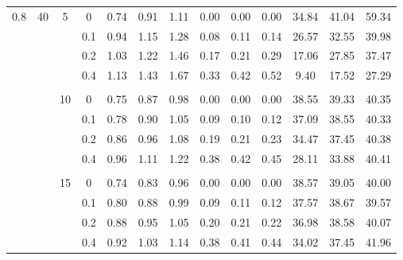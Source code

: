 \documentclass[]{article}
\begin{document}
\begin{table}[h!]
\begin{tabular}{cccc|ccc@{\hskip 0.3in}ccc@{\hskip 0.3in}ccc}
0.8        & 40    & 5            & 0      & 0.74    & 0.91  & 1.11  & 0.00   & 0.00  & 0.00  & 34.84 & 41.04 & 59.34 \\
           &       &              & 0.1    & 0.94    & 1.15  & 1.28  & 0.08   & 0.11  & 0.14  & 26.57 & 32.55 & 39.98 \\
           &       &              & 0.2    & 1.03    & 1.22  & 1.46  & 0.17   & 0.21  & 0.29  & 17.06 & 27.85 & 37.47 \\
           &       &              & 0.4    & 1.13    & 1.43  & 1.67  & 0.33   & 0.42  & 0.52  & 9.40  & 17.52 & 27.29 \\
           &       &              &        &         &       &       &        &       &       &       &       &       \\
           &       & 10           & 0      & 0.75    & 0.87  & 0.98  & 0.00   & 0.00  & 0.00  & 38.55 & 39.33 & 40.35 \\
           &       &              & 0.1    & 0.78    & 0.90  & 1.05  & 0.09   & 0.10  & 0.12  & 37.09 & 38.55 & 40.33 \\
           &       &              & 0.2    & 0.86    & 0.96  & 1.08  & 0.19   & 0.21  & 0.23  & 34.47 & 37.45 & 40.38 \\
           &       &              & 0.4    & 0.96    & 1.11  & 1.22  & 0.38   & 0.42  & 0.45  & 28.11 & 33.88 & 40.41 \\
           &       &              &        &         &       &       &        &       &       &       &       &       \\
           &       & 15           & 0      & 0.74    & 0.83  & 0.96  & 0.00   & 0.00  & 0.00  & 38.57 & 39.05 & 40.00 \\
           &       &              & 0.1    & 0.80    & 0.88  & 0.99  & 0.09   & 0.11  & 0.12  & 37.57 & 38.67 & 39.57 \\
           &       &              & 0.2    & 0.88    & 0.95  & 1.05  & 0.20   & 0.21  & 0.22  & 36.98 & 38.58 & 40.07 \\
           &       &              & 0.4    & 0.92    & 1.03  & 1.14  & 0.38   & 0.41  & 0.44  & 34.02 & 37.45 & 41.96
\end{tabular}
\end{table}


%
%
%
%
%
%
%
%
%
\end{document}
